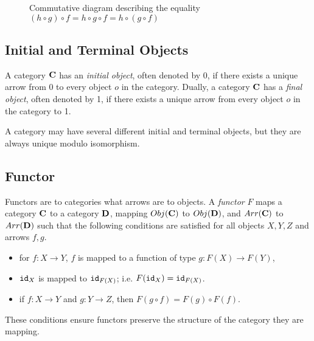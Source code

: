 \begin{figure}[t] 
    \centering
    \caption{Commutative diagram describing the equality $(h\circ g)\circ f= h\circ g \circ f= h \circ (g\circ f)$}
    \label{fig:Preliminaries:CommutativeDiagram} 
\end{figure}
\subsection{Initial and Terminal Objects}
A category $\AsCategory{C}$ has an \emph{initial object}, often denoted by 0, if there exists a unique arrow from $0$ to every object $o$ in the category. Dually, a category $\AsCategory{C}$ has a \emph{final object}, often denoted by 1, if there exists a unique arrow from every object $o$ in the category to 1. 

A category may have several different initial and terminal objects, but they are always unique modulo isomorphism.

\subsection{Functor}
Functors are to categories what arrows are to objects. A \emph{functor} $F$ maps a category $\AsCategory{C}$ to a category $\AsCategory{D}$, mapping $Obj(\AsCategory{C})$ to $Obj(\AsCategory{D})$, and $Arr(\AsCategory{C})$ to $Arr(\AsCategory{D})$ such that the following conditions are satisfied for all objects $X, Y, Z$ and arrows $f,g$.
\begin{itemize}
    \item for $f\colon X\rightarrow Y$, $f$ is mapped to a function of type $g\colon F(X)\rightarrow F(Y)$,
    \item ${\texttt{id}}_X$ is mapped to ${\texttt{id}}_{F(X)}$; i.e. $F({\texttt{id}}_{X})={\texttt{id}}_{F(X)}$.
    \item if $f\colon X\rightarrow Y$ and $g\colon Y\rightarrow Z$, then $F(g\circ f)=F(g)\circ F(f)$.
\end{itemize}
These conditions ensure functors preserve the structure of the category they are mapping.

